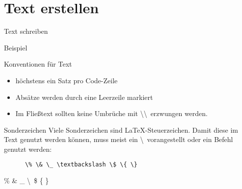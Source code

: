\section{Text erstellen}

\begin{frame}[fragile]{Text schreiben}
    \begin{block}{Beispiel}
    \end{block}
\end{frame}

\begin{frame}[fragile]{Konventionen für Text}
  \begin{itemize}
    \item höchstens ein Satz pro Code-Zeile
    \item Absätze werden durch eine Leerzeile markiert
    \item Im Fließtext sollten keine Umbrüche mit \textbackslash\textbackslash\ erzwungen werden.
  \end{itemize}
  \begin{alertblock}{Sonderzeichen}
    Viele Sonderzeichen sind \LaTeX-Steuerzeichen.
    Damit diese im Text genutzt werden können, muss meist ein \textbackslash\ vorangestellt oder ein Befehl genutzt werden:
    \begin{center}
      \begin{lstlisting}
      \% \& \_ \textbackslash \$ \{ \}
      \end{lstlisting}
      \% \& \_ \textbackslash\ \$ \{ \}
    \end{center}
  \end{alertblock}
\end{frame}

